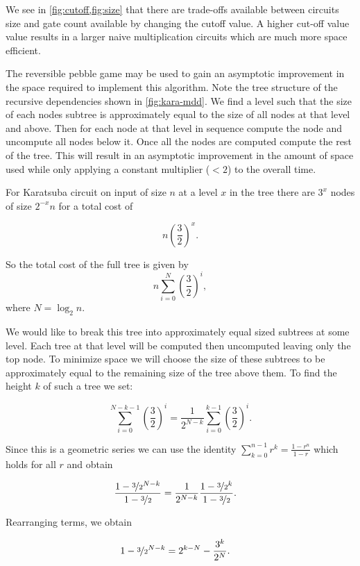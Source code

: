 We see in \cref{fig:cutoff,fig:size} that there are trade-offs available
between circuits size and gate count available by changing the cutoff
value. A higher cut-off value value results in a larger naive
multiplication circuits which are much more space efficient.

The reversible pebble game may be used to gain an asymptotic improvement
in the space required to implement this algorithm. Note the tree structure of
the recursive dependencies shown in \cref{fig:kara-mdd}.  We find a level such
that the size of each nodes subtree is approximately equal to the size of all
nodes at that level and above. Then for each node at that level in sequence
compute the node and uncompute all nodes below it. Once all the nodes are
computed compute the rest of the tree.  This will result in an asymptotic
improvement in the amount of space used while only applying a constant
multiplier ($<2$) to the overall time.


For Karatsuba circuit on input of size $n$ at a level $x$ in the tree there are
$3^x$ nodes of size $2^{-x}n$ for a total cost of

\[
n\left(\frac{3}{2}\right)^x.
\]

So the total cost of the full tree is given by
\[
    n\sum_{i=0}^{N} \left(\frac{3}{2}\right)^i,
\]
where $N=\log_2 n$.

We would like to break this tree into approximately equal sized subtrees at
some level.  Each tree at that level will be computed then uncomputed leaving
only the top node. To minimize space we will choose the size of these subtrees
to be approximately equal to the remaining size of the tree above them. To
find the height $k$ of such a tree we set:

\[
    \sum_{i=0}^{N-k-1} \left(\frac{3}{2}\right)^i = \frac{1}{2^{N-k}}\sum_{i=0}^{k-1} \left(\frac{3}{2}\right)^i.
\]

Since this is a geometric series we can use the identity $\sum_{k=0}^{n-1} r^k
= \frac{1-r^n}{1-r}$ which holds for all $r$ and obtain

\begin{align*}
    \frac{1- \nicefrac{3}{2}^{N-k}}{1 - \nicefrac{3}{2}} &= \frac{1}{2^{N-k}}\frac{1- \nicefrac{3}{2}^{k}}{1 - \nicefrac{3}{2}}.
\end{align*}

Rearranging terms, we obtain

\begin{align*}
    1- \nicefrac{3}{2}^{N-k} &= 2^{k-N} - \frac{3^k}{2^N}.
\end{align*}

